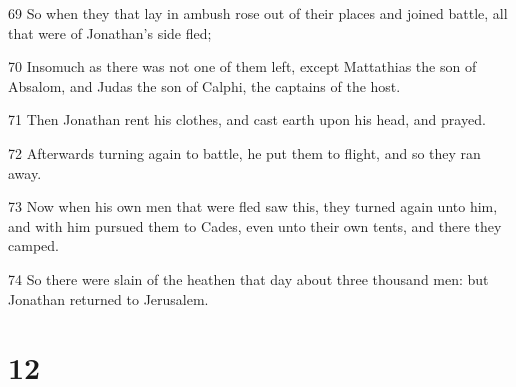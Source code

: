 \par 69 So when they that lay in ambush rose out of their places and joined battle, all that were of Jonathan's side fled;
\par 70 Insomuch as there was not one of them left, except Mattathias the son of Absalom, and Judas the son of Calphi, the captains of the host.
\par 71 Then Jonathan rent his clothes, and cast earth upon his head, and prayed.
\par 72 Afterwards turning again to battle, he put them to flight, and so they ran away.
\par 73 Now when his own men that were fled saw this, they turned again unto him, and with him pursued them to Cades, even unto their own tents, and there they camped.
\par 74 So there were slain of the heathen that day about three thousand men: but Jonathan returned to Jerusalem.

\chapter{12}

